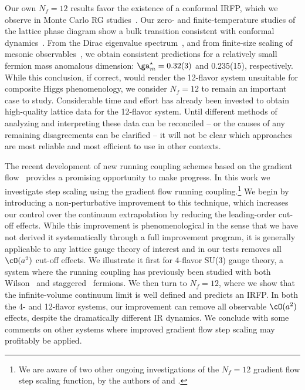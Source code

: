Our own $N_f = 12$ results favor the existence of a conformal IRFP, which we observe in Monte Carlo RG studies~\cite{Hasenfratz:2011xn, Petropoulos:2013gaa}.
Our zero- and finite-temperature studies of the lattice phase diagram show a bulk transition consistent with conformal dynamics~\cite{Schaich:2012fr, Hasenfratz:2013uha}.
From the Dirac eigenvalue spectrum~\cite{Cheng:2013eu}, and from finite-size scaling of mesonic observables~\cite{Cheng:2013xha}, we obtain consistent predictions for a relatively small fermion mass anomalous dimension: $\ga_m^{\star} = 0.32(3)$ and 0.235(15), respectively.
While this conclusion, if correct, would render the 12-flavor system unsuitable for composite Higgs phenomenology, we consider $N_f = 12$ to remain an important case to study.
Considerable time and effort has already been invested to obtain high-quality lattice data for the 12-flavor system.
Until different methods of analyzing and interpreting these data can be reconciled -- or the causes of any remaining disagreements can be clarified -- it will not be clear which approaches are most reliable and most efficient to use in other contexts.

The recent development of new running coupling schemes based on the gradient flow~\cite{Luscher:2009eq, Luscher:2010iy, Fodor:2012td, Fodor:2012qh, Fritzsch:2013je} provides a promising opportunity to make progress.
In this work we investigate step scaling using the gradient flow running coupling.\footnote{We are aware of two other ongoing investigations of the $N_f = 12$ gradient flow step scaling function, by the authors of  and .}
We begin by introducing a non-perturbative improvement to this technique, which increases our control over the continuum extrapolation by reducing the leading-order cut-off effects.
While this improvement is phenomenological in the sense that we have not derived it systematically through a full improvement program, it is generally applicable to any lattice gauge theory of interest and in our tests removes all $\cO(a^2)$ cut-off effects.
We illustrate it first for 4-flavor SU(3) gauge theory, a system where the running coupling has previously been studied with both Wilson~\cite{Tekin:2010mm} and staggered~\cite{PerezRubio:2010ke, Fodor:2012td, Fodor:2012qh} fermions.
We then turn to $N_f = 12$, where we show that the infinite-volume continuum limit is well defined and predicts an IRFP.
In both the 4- and 12-flavor systems, our improvement can remove all observable $\cO(a^2)$ effects, despite the dramatically different IR dynamics.
We conclude with some comments on other systems where improved gradient flow step scaling may profitably be applied.
